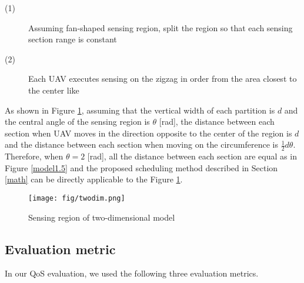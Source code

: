 \documentclass{ieeeaccess}
\begin{document}
\begin{description}
\item[(1)]  Assuming fan-shaped sensing region, split the region so that each sensing section range is constant
\item[(2)] Each UAV executes sensing on the zigzag in order from the area closest to the center like \cite{Maza2007}
\end{description}

As shown in Figure \ref{twodimention}, assuming that the vertical width of each partition is $d$ and the central angle of the sensing region is $\theta$ [rad], the distance between each section when UAV moves in the direction opposite to the center of the region is $d$ and the distance between each section when moving on the circumference is $\frac{1}{2}d\theta$.
Therefore, when $\theta=2$ [rad], all the distance between each section are equal as in Figure \ref{model1.5} and the proposed scheduling method described in Section \ref{math} can be directly applicable to the Figure \ref{twodimention}.

\begin{figure}[t]
\begin{center}
\texttt{[image: fig/twodim.png]}
\caption{Sensing region of two-dimensional model}
\label{twodimention}
\end{center}
\end{figure}

\subsection{Evaluation metric}\label{compare}
In our QoS evaluation, we used the following three evaluation metrics.
\end{document}
